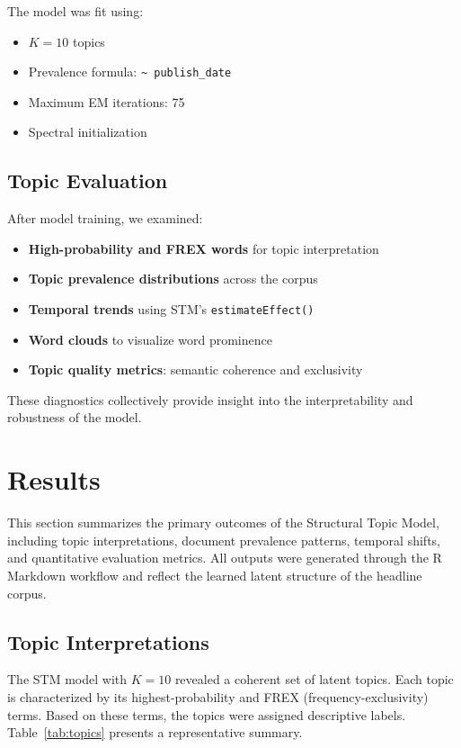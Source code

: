 \documentclass[11pt]{article}
\begin{document}
The model was fit using:

\begin{itemize}
    \item $K = 10$ topics
    \item Prevalence formula: \texttt{\textasciitilde{} publish\_date}
    \item Maximum EM iterations: 75
    \item Spectral initialization
\end{itemize}

\subsection{Topic Evaluation}

After model training, we examined:
\begin{itemize}
    \item \textbf{High-probability and FREX words} for topic interpretation
    \item \textbf{Topic prevalence distributions} across the corpus
    \item \textbf{Temporal trends} using STM's \texttt{estimateEffect()}
    \item \textbf{Word clouds} to visualize word prominence
    \item \textbf{Topic quality metrics}: semantic coherence and exclusivity
\end{itemize}

These diagnostics collectively provide insight into the interpretability and robustness of the model.

\section{Results}

This section summarizes the primary outcomes of the Structural Topic Model, including topic interpretations, document prevalence patterns, temporal shifts, and quantitative evaluation metrics. All outputs were generated through the R Markdown workflow and reflect the learned latent structure of the headline corpus.

\subsection{Topic Interpretations}

The STM model with $K = 10$ revealed a coherent set of latent topics. Each topic is characterized by its highest-probability and FREX (frequency-exclusivity) terms. Based on these terms, the topics were assigned descriptive labels. Table~\ref{tab:topics} presents a representative summary.
\end{document}
